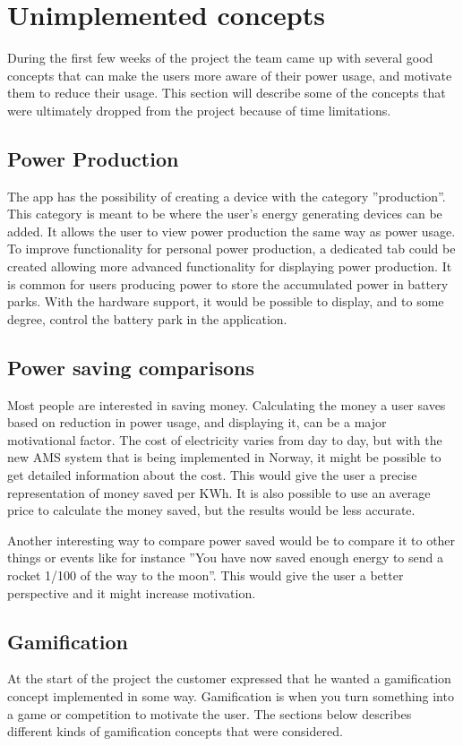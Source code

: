 \section{Unimplemented concepts}
During the first few weeks of the project the team came up with several good concepts that can make the users more aware of their power usage, and motivate them to reduce their usage. This section will describe some of the concepts that were ultimately dropped from the project because of time limitations.

\subsection{Power Production}
The app has the possibility of creating a device with the category ''production''. This category is meant to be where the user's energy generating devices can be added. It allows the user to view power production the same way as power usage. To improve functionality for personal power production, a dedicated tab could be created allowing more advanced functionality for displaying power production.
It is common for users producing power to store the accumulated power in battery parks. With the hardware support, it would be possible to display, and to some degree, control the battery park in the application.

\subsection{Power saving comparisons}
\label{sec:psc}
Most people are interested in saving money. Calculating the money a user saves based on reduction in power usage, and displaying it, can be a major motivational factor. The cost of electricity varies from day to day, but with the new AMS\cite{ams} system that is being implemented in Norway, it might be possible to get detailed information about the cost. This would give the user a precise representation of money saved per KWh. It is also possible to use an average price to calculate the money saved, but the results would be less accurate.

Another interesting way to compare power saved would be to compare it to other things or events like for instance ''You have now saved enough energy to send a rocket 1/100 of the way to the moon''. This would give the user a better perspective and it might increase motivation.

\subsection{Gamification}
At the start of the project the customer expressed that he wanted a gamification concept implemented in some way. Gamification is when you turn something into a game or competition to motivate the user. The sections below describes different kinds of gamification concepts that were considered.

